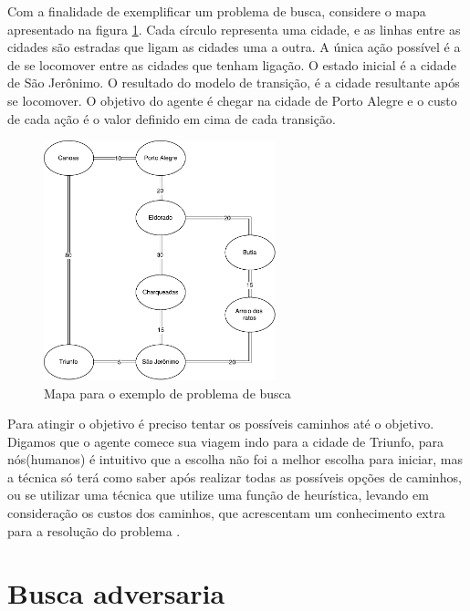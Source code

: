 Com a finalidade de exemplificar um problema de busca, considere o mapa apresentado na figura \ref{fig:mapabusca}. 
Cada círculo representa uma cidade, e as linhas entre as cidades são estradas que ligam as cidades uma a outra. 
A única ação possível é a de se locomover entre as cidades que tenham ligação. 
O estado inicial é a cidade de São Jerônimo. O resultado do modelo de transição, é a cidade resultante após se locomover. O objetivo do agente é chegar na cidade de Porto Alegre e o custo de cada ação é o valor definido em cima de cada transição. 

\begin{figure}[ht]
	\centering
	\includegraphics[width=0.6\textwidth]{fig/mapabusca.pdf}
	\caption{Mapa para o exemplo de problema de busca}
	\label{fig:mapabusca}
\end{figure} 

Para atingir o objetivo é preciso tentar os possíveis caminhos até o objetivo. 
Digamos que o agente comece sua viagem indo para a cidade de Triunfo, para nós(humanos) é intuitivo que a escolha não foi a melhor escolha para iniciar, mas a técnica só terá como saber após realizar todas as possíveis opções de caminhos, ou se utilizar uma técnica que utilize uma função de heurística, levando em consideração os custos dos caminhos, que acrescentam um conhecimento extra para a resolução do problema \cite{intelligence2003modern}.

\section{Busca adversaria}

